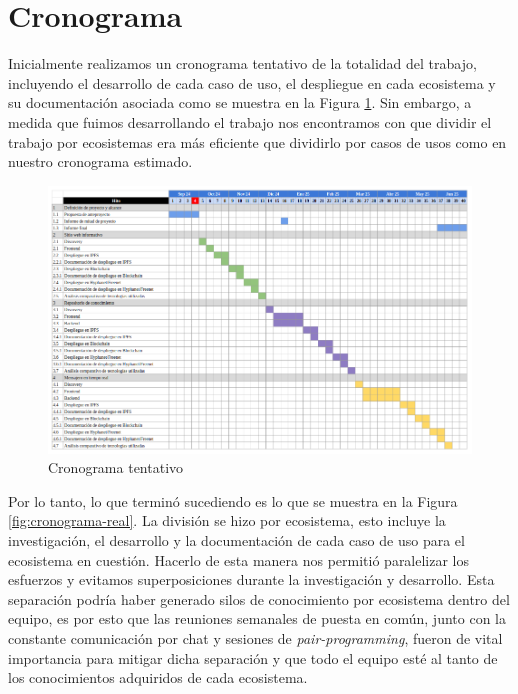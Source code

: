 \section{Cronograma}

Inicialmente realizamos un cronograma tentativo de la totalidad del trabajo, incluyendo el desarrollo de cada caso de uso, el despliegue en cada ecosistema y su documentación asociada como se muestra en la Figura \ref{fig:cronograma-tentativo}. Sin embargo, a medida que fuimos desarrollando el trabajo nos encontramos con que dividir el trabajo por ecosistemas era más eficiente que dividirlo por casos de usos como en nuestro cronograma estimado.

\begin{figure}[H]
    \includegraphics[width=1\linewidth]{img/cronograma.png}
    \caption{Cronograma tentativo}
    \label{fig:cronograma-tentativo}
\end{figure}

Por lo tanto, lo que terminó sucediendo es lo que se muestra en la Figura \ref{fig:cronograma-real}. La división se hizo por ecosistema, esto incluye la investigación, el desarrollo y la documentación de cada caso de uso para el ecosistema en cuestión. Hacerlo de esta manera nos permitió paralelizar los esfuerzos y evitamos superposiciones durante la investigación y desarrollo. Esta separación podría haber generado silos de conocimiento por ecosistema dentro del equipo, es por esto que las reuniones semanales de puesta en común, junto con la constante comunicación por chat y sesiones de \textit{pair-programming}, fueron de vital importancia para mitigar dicha separación y que todo el equipo esté al tanto de los conocimientos adquiridos de cada ecosistema.

